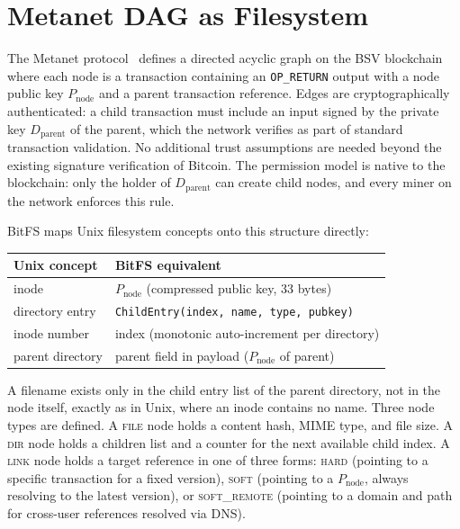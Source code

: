 \documentclass[11pt,a4paper]{article}
\begin{document}
\section{Metanet DAG as Filesystem}

The Metanet protocol~\cite{metanet} defines a directed acyclic graph on the BSV blockchain where each node is a transaction containing an \texttt{OP\_RETURN} output with a node public key $P_{\text{node}}$ and a parent transaction reference. Edges are cryptographically authenticated: a child transaction must include an input signed by the private key $D_{\text{parent}}$ of the parent, which the network verifies as part of standard transaction validation. No additional trust assumptions are needed beyond the existing signature verification of Bitcoin. The permission model is native to the blockchain: only the holder of $D_{\text{parent}}$ can create child nodes, and every miner on the network enforces this rule.

BitFS maps Unix filesystem concepts onto this structure directly:

\begin{table}[h]
\centering
\begin{tabular}{@{}ll@{}}
\toprule
\textbf{Unix concept} & \textbf{BitFS equivalent} \\
\midrule
inode & $P_{\text{node}}$ (compressed public key, 33 bytes) \\
directory entry & \texttt{ChildEntry(index, name, type, pubkey)} \\
inode number & index (monotonic auto-increment per directory) \\
parent directory & parent field in payload ($P_{\text{node}}$ of parent) \\
\bottomrule
\end{tabular}
\end{table}

A filename exists only in the child entry list of the parent directory, not in the node itself, exactly as in Unix, where an inode contains no name. Three node types are defined. A \textsc{file} node holds a content hash, MIME type, and file size. A \textsc{dir} node holds a children list and a counter for the next available child index. A \textsc{link} node holds a target reference in one of three forms: \textsc{hard} (pointing to a specific transaction for a fixed version), \textsc{soft} (pointing to a $P_{\text{node}}$, always resolving to the latest version), or \textsc{soft\_remote} (pointing to a domain and path for cross-user references resolved via DNS).
\end{document}
